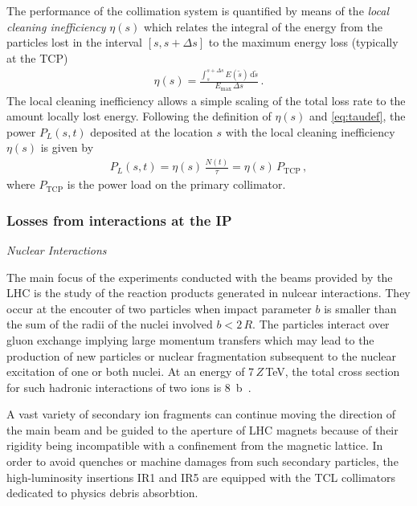 The performance of the collimation system is quantified by means of the \textit{local cleaning inefficiency} $\eta(s)$ which relates the integral of the energy from the particles lost in the interval $[s,s+\Delta s]$ to the maximum energy loss (typically at the TCP)
%
\begin{align}
  \eta(s) = \frac{\int_s^{s+\Delta s} E(\tilde{s}) \, \mathrm{d} \tilde{s} }{E_\text{max} \, \Delta s} \, .
\end{align}
%
%
The local cleaning inefficiency allows a simple scaling of the total loss rate to the amount locally lost energy. Following the definition of $\eta(s)$ and \eqref{eq:taudef}, the power $P_L(s,t)$ deposited at the location $s$ with the local cleaning inefficiency $\eta(s)$ is given by
%
%
\begin{align}
  P_L(s,t) = \eta(s) \, \frac{N(t)}{\tau} = \eta(s) \, P_\text{TCP} \, ,
\end{align}
%
where $P_\text{TCP}$ is the power load on the primary collimator.

%
\subsubsection{Losses from interactions at the IP}



\textit{Nuclear Interactions} 

The main focus of the experiments conducted with the beams provided by the LHC is the study of the reaction products generated in nulcear interactions. They occur at the encouter of two particles when impact parameter $b$ is smaller than the sum of the radii of the nuclei involved $b<2\,R$. The particles interact over gluon exchange implying large momentum transfers which may lead to the production of new particles or nuclear fragmentation subsequent to the nuclear excitation of one or both nuclei. At an energy of 7$\,Z\,$TeV, the total cross section for such hadronic interactions of two \lead ions is 8~b~\cite{}. 

A vast variety of secondary ion fragments can continue moving the direction of the main beam and be guided to the aperture of LHC magnets because of their rigidity being incompatible with a confinement from the magnetic lattice. In order to avoid quenches or machine damages from such secondary particles, the high-luminosity insertions IR1 and IR5 are equipped with the TCL collimators dedicated to physics debris absorbtion. 



